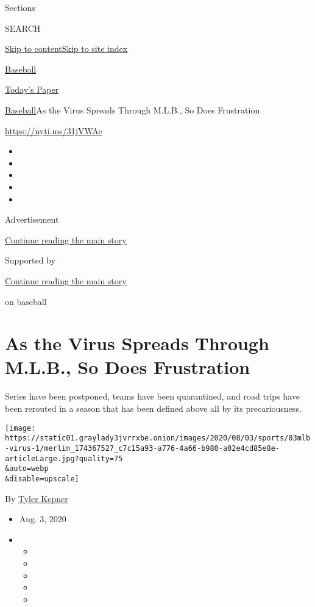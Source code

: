 Sections

SEARCH

\protect\hyperlink{site-content}{Skip to
content}\protect\hyperlink{site-index}{Skip to site index}

\href{https://www.nytimes3xbfgragh.onion/section/sports/baseball}{Baseball}

\href{https://myaccount.nytimes3xbfgragh.onion/auth/login?response_type=cookie\&client_id=vi}{}

\href{https://www.nytimes3xbfgragh.onion/section/todayspaper}{Today's
Paper}

\href{/section/sports/baseball}{Baseball}\textbar{}As the Virus Spreads
Through M.L.B., So Does Frustration

\url{https://nyti.ms/31jVWAe}

\begin{itemize}
\item
\item
\item
\item
\item
\end{itemize}

Advertisement

\protect\hyperlink{after-top}{Continue reading the main story}

Supported by

\protect\hyperlink{after-sponsor}{Continue reading the main story}

on baseball

\hypertarget{as-the-virus-spreads-through-mlb-so-does-frustration}{%
\section{As the Virus Spreads Through M.L.B., So Does
Frustration}\label{as-the-virus-spreads-through-mlb-so-does-frustration}}

Series have been postponed, teams have been quarantined, and road trips
have been rerouted in a season that has been defined above all by its
precariousness.

\texttt{[image: https://static01.graylady3jvrrxbe.onion/images/2020/08/03/sports/03mlb-virus-1/merlin\_174367527\_c7c15a93-a776-4a66-b980-a02e4cd85e8e-articleLarge.jpg?quality=75\\\&auto=webp\\\&disable=upscale]}

By \href{https://www.nytimes3xbfgragh.onion/by/tyler-kepner}{Tyler
Kepner}

\begin{itemize}
\item
  Aug. 3, 2020
\item
  \begin{itemize}
  \item
  \item
  \item
  \item
  \item
  \end{itemize}
\end{itemize}

